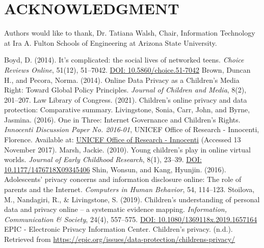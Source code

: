 \documentclass[a4paper, 10 pt, conference]{ieeeconf}  %
\begin{document}


\section*{ACKNOWLEDGMENT}

Authors would like to thank, Dr. Tatiana Walsh, Chair, Information Technology at Ira A. Fulton Schools of Engineering at Arizona State University.






\begin{thebibliography}{99}

 Boyd, D. (2014). It’s complicated: the social lives of networked teens. \textit{Choice Reviews Online}, 51(12), 51–7042. \href{https://doi.org/10.5860/choice.51-7042}{DOI: 10.5860/choice.51-7042}
 Brown, Duncan H., and Pecora, Norma. (2014). Online Data Privacy as a Children’s Media Right: Toward Global Policy Principles. \textit{Journal of Children and Media}, 8(2), 201–207.
  Law Library of Congress. (2021). Children’s online privacy and data protection: Comparative summary.
Livingstone, Sonia, Carr, John, and Byrne, Jasmina. (2016). One in Three: Internet Governance and Children’s Rights. \textit{Innocenti Discussion Paper No. 2016-01}, UNICEF Office of Research - Innocenti, Florence. Available at: \href{https://www.unicef-irc.org}{UNICEF Office of Research - Innocenti} (Accessed 13 November 2017).
 Marsh, Jackie. (2010). Young children’s play in online virtual worlds. \textit{Journal of Early Childhood Research}, 8(1), 23–39. \href{https://doi.org/10.1177/1476718X09345406}{DOI: 10.1177/1476718X09345406}
 Shin, Wonsun, and Kang, Hyunjin. (2016). Adolescents’ privacy concerns and information disclosure online: The role of parents and the Internet. \textit{Computers in Human Behavior}, 54, 114–123.
Stoilova, M., Nandagiri, R., \& Livingstone, S. (2019). Children’s understanding of personal data and privacy online – a systematic evidence mapping. \textit{Information, Communication \& Society}, 24(4), 557–575. \href{https://doi.org/10.1080/1369118x.2019.1657164}{DOI: 10.1080/1369118x.2019.1657164}
 EPIC - Electronic Privacy Information Center. Children’s privacy. (n.d.). Retrieved from \href{https://epic.org/issues/data-protection/childrens-privacy/}{https://epic.org/issues/data-protection/childrens-privacy/}

\end{thebibliography}
\end{document}

